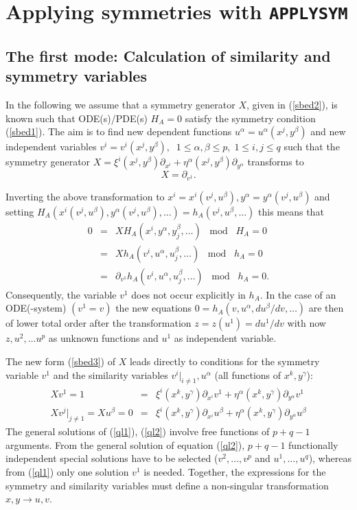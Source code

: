 \section{Applying symmetries with {\tt APPLYSYM}}
\subsection{The first mode: Calculation of similarity and symmetry variables}
In the following we assume that a symmetry generator $X$, given
in (\ref{sbed2}), is known such that ODE(s)/PDE(s) $H_A=0$
satisfy the symmetry condition (\ref{sbed1}). The aim is to
find new dependent functions $u^\alpha = u^\alpha(x^j,y^\beta)$ and
new independent variables $v^i = v^i(x^j,y^\beta),\;\;
1\leq\alpha,\beta\leq p,\;1\leq i,j \leq q$
such that the symmetry generator
$X = \xi^i(x^j,y^\beta)\partial_{x^i} +
     \eta^\alpha(x^j,y^\beta)\partial_{y^\alpha}$
transforms to
\begin{equation}
X = \partial_{v^1}.    \label{sbed3}
\end{equation}

Inverting the above transformation to $x^i=x^i(v^j,u^\beta),
y^\alpha=y^\alpha(v^j,u^\beta)$ and setting
$H_A(x^i(v^j,u^\beta), y^\alpha(v^j,u^\beta),\ldots) =
h_A(v^j, u^\beta,\ldots)$
this means that
\begin{eqnarray*}
 0 & = & X H_A(x^i,y^\alpha,y^\beta_j,\ldots)\;\;\; \mbox{mod} \;\;\; H_A=0 \\
   & = & X h_A(v^i,u^\alpha,u^\beta_j,\ldots)\;\;\; \mbox{mod} \;\;\; h_A=0 \\
   & = & \partial_{v^1}h_A(v^i,u^\alpha,u^\beta_j,\ldots)\;\;\; \mbox{mod}
         \;\;\; h_A=0.
\end{eqnarray*}
Consequently, the variable $v^1$ does not occur explicitly in $h_A$.
In the case of an ODE(-system) $(v^1=v)$
the new equations $0=h_A(v,u^\alpha,du^\beta/dv,\ldots)$
are then of lower total order
after the transformation $z = z(u^1) = du^1/dv$ with now $z, u^2,\ldots u^p$
as unknown functions and $u^1$ as independent variable.

The new form (\ref{sbed3}) of $X$ leads directly to conditions for the
symmetry variable $v^1$ and the similarity variables
$v^i|_{i\neq 1}, u^\alpha$ (all functions of $x^k,y^\gamma$):
\begin{eqnarray}
 X v^1 = 1 & = & \xi^i(x^k,y^\gamma)\partial_{x^i}v^1 +
                \eta^\alpha(x^k,y^\gamma)\partial_{y^\alpha}v^1 \label{ql1} \\
 X v^j|_{j\neq 1} = X u^\beta = 0 & = &
                 \xi^i(x^k,y^\gamma)\partial_{x^i}u^\beta +
                 \eta^\alpha(x^k,y^\gamma)\partial_{y^\alpha}u^\beta \label{ql2}
\end{eqnarray}
The general solutions of (\ref{ql1}), (\ref{ql2}) involve free functions
of $p+q-1$ arguments. From the general solution of equation (\ref{ql2}),
$p+q-1$ functionally independent special solutions have to be selected
($v^2,\ldots,v^p$ and $u^1,\ldots,u^q$),
whereas from (\ref{ql1}) only one solution $v^1$ is needed.
Together, the expressions for the symmetry and similarity variables must
define a non-singular transformation $x,y \rightarrow u,v$.

